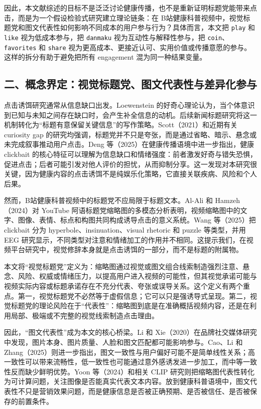 \documentclass[
  12pt,
]{article}
\begin{document}
因此，本文献综述的目标不是泛泛讨论健康传播，也不是重新证明标题党能带来点击，而是为一个假设检验式研究建立理论链条：在
B站健康科普视频中，视觉标题党和图文代表性如何影响不同成本的用户参与行为？具体而言，本文把
\texttt{play} 和 \texttt{like} 视为低成本参与，把 \texttt{danmaku}
视为互动性与解释性参与，把 \texttt{coin}、\texttt{favorites} 和
\texttt{share}
视为更高成本、更接近认可、实用价值或传播意愿的参与。这样的拆分有助于避免把所有
engagement 混为同一种结果变量。

\subsection{二、概念界定：视觉标题党、图文代表性与差异化参与}\label{ux4e8cux6982ux5ff5ux754cux5b9aux89c6ux89c9ux6807ux9898ux515aux56feux6587ux4ee3ux8868ux6027ux4e0eux5deeux5f02ux5316ux53c2ux4e0e}

点击诱饵研究通常从信息缺口出发。Loewenstein
的好奇心理论认为，当个体意识到已知与未知之间存在缺口时，会产生补全信息的动机。后续新闻标题研究将这一机制转化为``标题有意保留关键信息''的写作策略。Scott（2021）和近期有关
curiosity gap
的研究均强调，标题党并不只是夸张，而是通过省略、暗示、悬念或未完成叙事推动用户点击。Deng
等（2025）在健康传播语境中进一步指出，健康 clickbait
的核心特征可以理解为信息缺口和情绪强度：前者激发好奇与错失恐惧，促进点击；后者可能引发对他人评价的担忧，从而抑制分享。这一发现对本研究很关键，因为健康内容的点击诱饵不是纯娱乐化策略，它直接关联疾病、风险和个人后果。

然而，B站健康科普视频中的标题党不应局限于标题文本。Al-Ali 和
Hamzeh（2024）对 YouTube
阿语标题党缩略图的多模态分析表明，视频缩略图中的文字、图像、表情、标点和构图共同构成诱导点击的意义系统。Wang
等（2025）把 clickbait 分为 hyperbole、insinuation、visual rhetoric 和
puzzle 等类型，并用 EEG
研究显示，不同类型对注意和情绪加工的作用并不相同。这提示我们，在视频平台研究中，视觉修辞本身就是点击诱饵的一部分，而不是标题的附属物。

本文将``视觉标题党''定义为：缩略图通过视觉或图文组合线索制造强烈注意、悬念、风险、权威或情绪压力，以提高用户进入视频的可能性，但其视觉承诺可能与视频实际内容或标题承诺存在不充分代表、夸张或误导关系。这个定义有两个重点。第一，视觉标题党不必然等于虚假信息；它可以只是强诱导式呈现。第二，视觉标题党的理论风险在于``代表性''：缩略图到底是在准确概括视频内容，还是在利用局部、极端或不完整的视觉线索制造点击理由。

因此，``图文代表性''成为本文的核心桥梁。Li 和
Xie（2020）在品牌社交媒体研究中发现，图片本身、图片质量、人脸和图文匹配都可能影响参与。Cao、Li
和
Zhang（2025）则进一步指出，图文一致性与用户偏好可能不是简单线性关系；高一致性可以带来流畅性，低一致性也可能通过意外感诱发进一步加工，而中等一致性反而缺少鲜明优势。Yoon
等（2024）和相关 CLIP
研究则把缩略图代表性转化为可计算问题，关注图像是否能真实代表文本内容。放到健康科普语境中，图文代表性不只是营销效果问题，而是健康信息是否被正确预期、是否被信任、是否被保存的前置条件。
\end{document}
